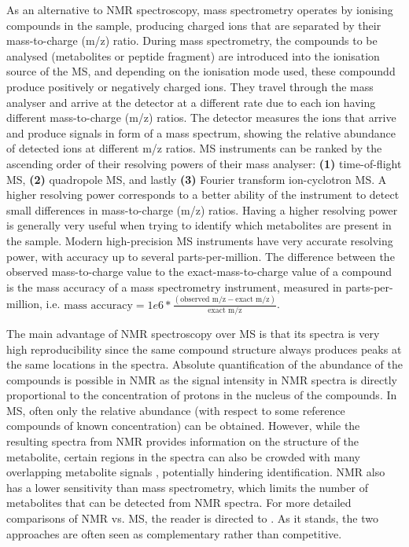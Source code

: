 As an alternative to NMR spectroscopy, mass spectrometry operates by ionising compounds in the sample, producing charged ions that are separated by their mass-to-charge (m/z) ratio. During mass spectrometry, the compounds to be analysed (metabolites or peptide fragment) are introduced into the ionisation source of the MS, and depending on the ionisation mode used, these compoundd produce positively or negatively charged ions. They travel through the mass analyser and arrive at the detector at a different rate due to each ion having different mass-to-charge (m/z) ratios. The detector measures the ions that arrive and produce signals in form of a mass spectrum, showing the relative abundance of detected ions at different m/z ratios. MS instruments can be ranked by the ascending order of their resolving powers of their mass analyser: \textbf{(1)} time-of-flight MS, \textbf{(2)} quadropole MS, and lastly \textbf{(3)} Fourier transform ion-cyclotron MS. A higher resolving power corresponds to a better ability of the instrument to detect small differences in mass-to-charge (m/z) ratios. Having a higher resolving power is generally very useful when trying to identify which metabolites are present in the sample. Modern high-precision MS instruments have very accurate resolving power, with accuracy up to several parts-per-million. The difference between the observed mass-to-charge value to the exact-mass-to-charge value of a compound is the mass accuracy of a mass spectrometry instrument, measured in parts-per-million, i.e. $\text{mass accuracy} = 1e6 * \frac{(\text{observed m/z} - \text{exact m/z})}{\text{exact m/z}}$. 

The main advantage of NMR spectroscopy over MS is that its spectra is very high reproducibility since the same compound structure always produces peaks at the same locations in the spectra. Absolute quantification of the abundance of the compounds is possible in NMR as the signal intensity in NMR spectra is directly proportional to the concentration of protons in the nucleus of the compounds. In MS, often only the relative abundance (with respect to some reference compounds of known concentration) can be obtained. However, while the resulting spectra from NMR provides information on the structure of the metabolite, certain regions in the spectra can also be crowded with many overlapping metabolite signals \cite{Pan2007}, potentially hindering identification. NMR also has a lower sensitivity than mass spectrometry, which limits the number of metabolites that can be detected from NMR spectra. For more detailed comparisons of NMR vs. MS, the reader is directed to \cite{Pan2007}. As it stands, the two approaches are often seen as complementary rather than competitive.

